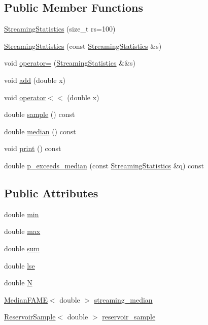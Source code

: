\subsection*{Public Member Functions}
\begin{DoxyCompactItemize}
\item 
\hyperlink{class_streaming_statistics_a92bd26dffa8b7569afc01c4a6ebe4e87}{Streaming\+Statistics} (size\+\_\+t rs=100)
\item 
\hyperlink{class_streaming_statistics_a2ee20794cfeed51064973dd896b8301d}{Streaming\+Statistics} (const \hyperlink{class_streaming_statistics}{Streaming\+Statistics} \&s)
\item 
void \hyperlink{class_streaming_statistics_a5de96edb2c4ec6731727abccba62ee05}{operator=} (\hyperlink{class_streaming_statistics}{Streaming\+Statistics} \&\&s)
\item 
void \hyperlink{class_streaming_statistics_a73d94e1b08f507a69e628659cbc3e038}{add} (double x)
\item 
void \hyperlink{class_streaming_statistics_a46287a138460b2041a6852ae1eab771b}{operator$<$$<$} (double x)
\item 
double \hyperlink{class_streaming_statistics_a8f3e61b4bddcb595aad3ffe8f4a29386}{sample} () const
\item 
double \hyperlink{class_streaming_statistics_aca180830d3a1583462a3b0f2af758d46}{median} () const
\item 
void \hyperlink{class_streaming_statistics_acabe8ea468a38ed5dc6d3bc4f74ea8cf}{print} () const
\item 
double \hyperlink{class_streaming_statistics_a2ea7b12391b6d6099db58e3b6db14b08}{p\+\_\+exceeds\+\_\+median} (const \hyperlink{class_streaming_statistics}{Streaming\+Statistics} \&q) const
\end{DoxyCompactItemize}
\subsection*{Public Attributes}
\begin{DoxyCompactItemize}
\item 
double \hyperlink{class_streaming_statistics_af3e7f12b8482b0d1bf9d1cc9da72ea39}{min}
\item 
double \hyperlink{class_streaming_statistics_a4b32bef717bb1c03bff2ba98d63a5a79}{max}
\item 
double \hyperlink{class_streaming_statistics_aaa50f5ed5a8c7491f63f9ae88394bc44}{sum}
\item 
double \hyperlink{class_streaming_statistics_a3a97b9810d5f7e52197689166c908da9}{lse}
\item 
double \hyperlink{class_streaming_statistics_a711076d8670ebbbd0089adcdba28968e}{N}
\item 
\hyperlink{class_median_f_a_m_e}{Median\+F\+A\+ME}$<$ double $>$ \hyperlink{class_streaming_statistics_a3a16ed90414b6fefd56d519162406bbd}{streaming\+\_\+median}
\item 
\hyperlink{class_reservoir_sample}{Reservoir\+Sample}$<$ double $>$ \hyperlink{class_streaming_statistics_af21bb0006db1b937c404458bd6dae160}{reservoir\+\_\+sample}
\end{DoxyCompactItemize}
